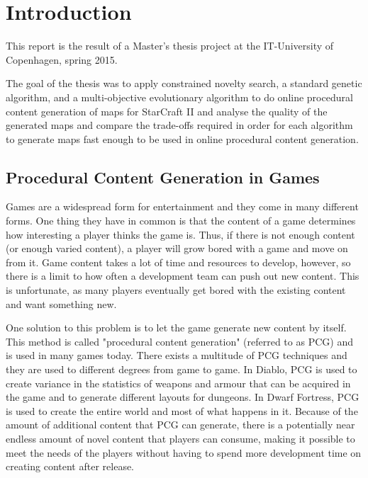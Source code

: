 \chapter{Introduction}
\label{introduction}

This report is the result of a Master's thesis project at the IT-University of Copenhagen, spring 2015.

The goal of the thesis was to apply constrained novelty search, a standard genetic algorithm, and a multi-objective evolutionary algorithm to do online procedural content generation of maps for StarCraft II and analyse the quality of the generated maps and compare the trade-offs required in order for each algorithm to generate maps fast enough to be used in online\cite{shaker2015procedural} procedural content generation.

\section{Procedural Content Generation in Games}
\label{introduction_pcg}

Games are a widespread form for entertainment and they come in many different forms. One thing they have in common is that the content of a game determines how interesting a player thinks the game is. Thus, if there is not enough content (or enough varied content), a player will grow bored with a game and move on from it. Game content takes a lot of time and resources to develop, however, so there is a limit to how often a development team can push out new content. This is unfortunate, as many players eventually get bored with the existing content and want something new.

One solution to this problem is to let the game generate new content by itself. This method is called "procedural content generation" (referred to as PCG) and is used in many games today. There exists a multitude of PCG techniques and they are used to different degrees from game to game. In Diablo\cite{diablo3}, PCG is used to create variance in the statistics of weapons and armour that can be acquired in the game and to generate different layouts for dungeons. In Dwarf Fortress\cite{dwarffortress}, PCG is used to create the entire world and most of what happens in it. Because of the amount of additional content that PCG can generate, there is a potentially near endless amount of novel content that players can consume, making it possible to meet the needs of the players without having to spend more development time on creating content after release.
